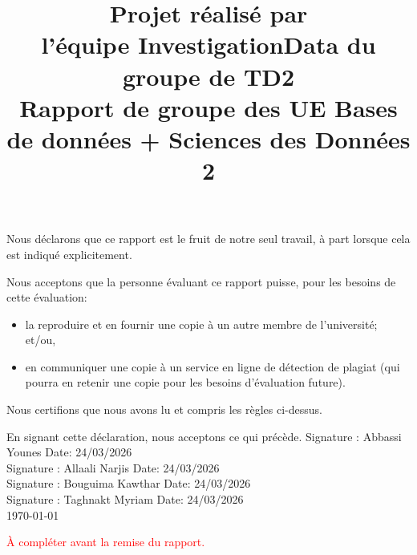 \documentclass[mstat,12pt]{unswthesis}
\title{Projet réalisé par\\[0.5cm] l'équipe InvestigationData du groupe de TD2 \\[3cm]Rapport
de groupe des UE \newline Bases de données + Sciences des Données 2}
\author{\Authornameonly}
\begin{document}
\beforepreface




\vskip 2pc \noindent Nous déclarons que ce rapport est le fruit de notre seul travail, à part lorsque cela est indiqué  explicitement. 

\vskip 2pc  \noindent Nous acceptons que la personne évaluant ce rapport puisse, pour les besoins de cette évaluation:
\begin{itemize}
\item la reproduire et en fournir une copie à un autre membre de l'université; et/ou,
\item en communiquer une copie à un service en ligne de détection de plagiat (qui pourra en retenir une copie pour les besoins d'évaluation future).
\end{itemize}

\vskip 2pc \noindent Nous certifions que nous avons lu et compris les règles ci-dessus.\vspace{24pt}

\vskip 2pc \noindent En signant cette déclaration, nous acceptons ce qui précède.
\vskip 2pc \noindent
Signature : Abbassi Younes \hfill Date: 24/03/2026\\[1cm]
Signature : Allaali Narjis \hfill Date: 24/03/2026 \\[1cm]
Signature : Bouguima Kawthar \hfill Date: 24/03/2026\\[1cm]
Signature : Taghnakt Myriam \hfill Date: 24/03/2026 \\[1cm]


{\bigskip\bigskip\bigskip\noindent} \today




\textcolor{red}{À compléter avant la remise du rapport.}
\end{document}
